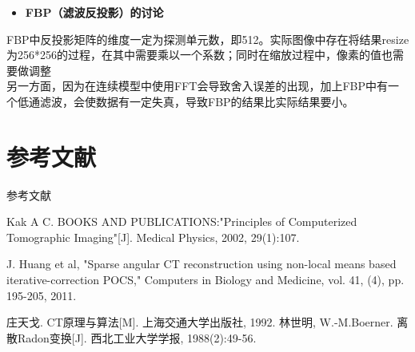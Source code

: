 \documentclass{beamer}
\begin{document}

\begin{frame}
	\begin{itemize}
		\item \textbf{FBP（滤波反投影）的讨论}
	\end{itemize}

	\small FBP中反投影矩阵的维度一定为探测单元数，即512。实际图像中存在将结果resize为256*256的过程，在其中需要乘以一个系数；同时在缩放过程中，像素的值也需要做调整\\
	\small 另一方面，因为在连续模型中使用FFT会导致舍入误差的出现，加上FBP中有一个低通滤波，会使数据有一定失真，导致FBP的结果比实际结果要小。
\end{frame}

\section{参考文献}
\begin{frame}{参考文献}
	\begin{thebibliography}{0}
		Kak A C. BOOKS AND PUBLICATIONS:"Principles of Computerized Tomographic Imaging"[J]. Medical Physics, 2002, 29(1):107.
		    
		J. Huang et al, "Sparse angular CT reconstruction using non-local means based iterative-correction POCS," Computers in Biology and Medicine, vol. 41, (4), pp. 195-205, 2011.
		    
		庄天戈. CT原理与算法[M]. 上海交通大学出版社, 1992.
		林世明, W.-M.Boerner. 离散Radon变换[J]. 西北工业大学学报, 1988(2):49-56.
	\end{thebibliography}
\end{frame} %
\end{document}
